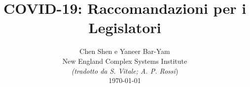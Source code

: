 \documentclass[onecolumn,journal]{IEEEtran}
\begin{document}
\title{\color{Brown} COVID-19: Raccomandazioni per i Legislatori
 \\
\vspace{-0.35ex}}
\author{Chen Shen e Yaneer Bar-Yam \\ New England Complex Systems Institute \\
\vspace{+0.35ex}
\small{\textit{(tradotto da S. Vitale; A. P. Rossi})}\\
 \today
  \vspace{-14ex} \\


\bigskip
\bigskip

\textbf{}
 }

\maketitle


\flushbottom %



\thispagestyle{empty} %




\renewcommand{\thefootnote}{\fnsymbol{footnote}}
\end{document}
